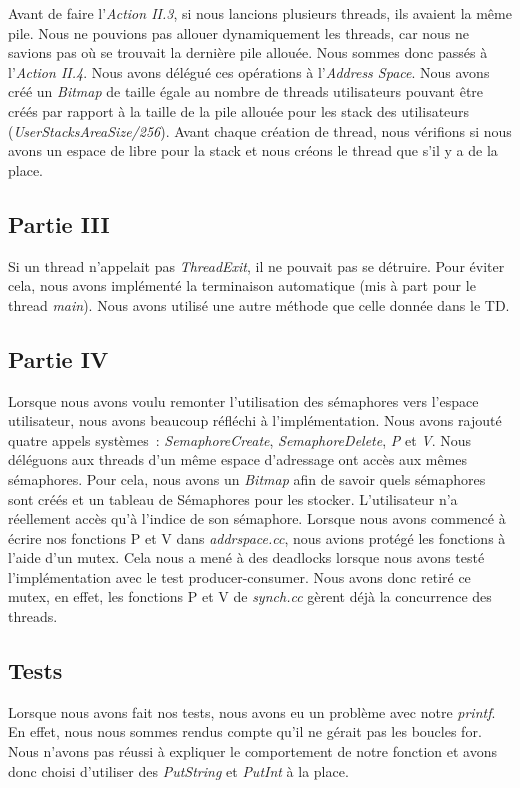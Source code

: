 \documentclass{article}
\begin{document}
Avant de faire l'\textit{Action II.3}, si nous lancions plusieurs threads, ils avaient la même pile.
Nous ne pouvions pas allouer dynamiquement les threads, car nous ne savions pas où se trouvait
la dernière pile allouée. Nous sommes donc passés à l'\textit{Action II.4}. Nous avons délégué
ces opérations à l'\textit{Address Space}. Nous avons créé un \textit{Bitmap} de taille égale au 
nombre de threads utilisateurs pouvant être créés par rapport à la taille de la pile allouée pour 
les stack des utilisateurs (\textit{UserStacksAreaSize/256}). Avant chaque création
de thread, nous vérifions si nous avons un espace de libre pour la stack et nous créons le thread que s'il y a de la place.

\subsection{Partie III}
Si un thread n'appelait pas \textit{ThreadExit}, il ne pouvait pas se détruire. Pour éviter cela, nous avons implémenté la terminaison 
automatique (mis à part pour le thread \textit{main}). Nous avons utilisé une autre méthode que celle donnée dans le TD.


\subsection{Partie IV}
Lorsque nous avons voulu remonter l'utilisation des sémaphores vers l'espace
utilisateur, nous avons beaucoup réfléchi à l'implémentation. Nous avons
rajouté quatre appels systèmes : \textit{SemaphoreCreate},
\textit{SemaphoreDelete}, \textit{P} et \textit{V}. Nous déléguons aux threads
d'un même espace d'adressage ont accès aux mêmes sémaphores. Pour cela, nous
avons un \textit{Bitmap} afin de savoir quels sémaphores sont créés et un
tableau de Sémaphores pour les stocker. L'utilisateur n'a réellement accès qu'à
l'indice de son sémaphore. Lorsque nous avons commencé à écrire nos fonctions P
et V dans \textit{addrspace.cc}, nous avions protégé les fonctions à l'aide
d'un mutex. Cela nous a mené à des deadlocks lorsque nous avons testé
l'implémentation avec le test producer-consumer. Nous avons donc retiré ce
mutex, en effet, les fonctions P et V de \textit{synch.cc} gèrent déjà la
concurrence des threads.

\subsection{Tests}
Lorsque nous avons fait nos tests, nous avons eu un problème avec notre
\textit{printf}. En effet, nous nous sommes rendus compte qu'il ne gérait pas
les boucles for. Nous n'avons pas réussi à expliquer le comportement de notre
fonction et avons donc choisi d'utiliser des \textit{PutString} et
\textit{PutInt} à la place.
\end{document}
